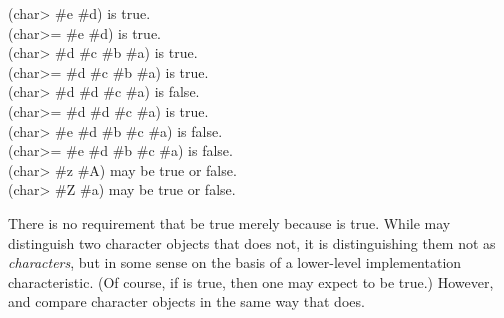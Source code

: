 \begin{defun}[Function]
\begin{lisp}
(char> \#{\Xbackslash}e \#{\Xbackslash}d) \textrm{is true.} \\
(char>= \#{\Xbackslash}e \#{\Xbackslash}d) \textrm{is true.} \\
(char> \#{\Xbackslash}d \#{\Xbackslash}c \#{\Xbackslash}b \#{\Xbackslash}a) \textrm{is true.} \\
(char>= \#{\Xbackslash}d \#{\Xbackslash}c \#{\Xbackslash}b \#{\Xbackslash}a) \textrm{is true.} \\
(char> \#{\Xbackslash}d \#{\Xbackslash}d \#{\Xbackslash}c \#{\Xbackslash}a) \textrm{is false.} \\
(char>= \#{\Xbackslash}d \#{\Xbackslash}d \#{\Xbackslash}c \#{\Xbackslash}a) \textrm{is true.} \\
(char> \#{\Xbackslash}e \#{\Xbackslash}d \#{\Xbackslash}b \#{\Xbackslash}c \#{\Xbackslash}a) \textrm{is false.} \\
(char>= \#{\Xbackslash}e \#{\Xbackslash}d \#{\Xbackslash}b \#{\Xbackslash}c \#{\Xbackslash}a) \textrm{is false.} \\
(char> \#{\Xbackslash}z \#{\Xbackslash}A) \textrm{may be true or false.} \\
(char> \#{\Xbackslash}Z \#{\Xbackslash}a) \textrm{may be true or false.}
\end{lisp}

There is no requirement that  be true merely because
 is true.  While  may distinguish two character
objects that  does not, it is distinguishing them not
as \emph{characters}, but in some sense on the basis of a lower-level
implementation characteristic.
(Of course, if  is true,
then one may expect  to be true.)
However,  and 
compare character objects in the same
way that  does.
\end{defun}

